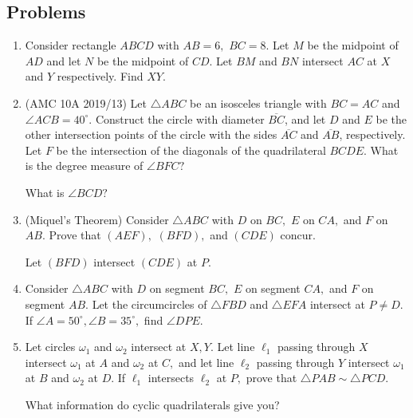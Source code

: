 \subsection{Problems}

\begin{enumerate}
    \item Consider rectangle $ABCD$ with $AB = 6,$ $BC = 8.$ Let $M$ be the midpoint of $AD$ and let $N$ be the midpoint of $CD.$ Let $BM$ and $BN$ intersect $AC$ at $X$ and $Y$ respectively. Find $XY.$

    \item (AMC 10A 2019/13) Let $\triangle ABC$ be an isosceles triangle with $BC = AC$ and $\angle ACB = 40^{\circ}$. Construct the circle with diameter $\overline{BC}$, and let $D$ and $E$ be the other intersection points of the circle with the sides $\overline{AC}$ and $\overline{AB}$, respectively. Let $F$ be the intersection of the diagonals of the quadrilateral $BCDE$. What is the degree measure of $\angle BFC?$ \begin{hint}
    \begin{addhint}
    {What is $\angle BCD?$}
    \end{addhint}
    \end{hint}
    
    \item (Miquel's Theorem) Consider $\triangle ABC$ with $D$ on $BC,$ $E$ on $CA,$ and $F$ on $AB.$ Prove that $(AEF),$ $(BFD),$ and $(CDE)$ concur. \begin{hint}
    \begin{addhint}
    {Let $(BFD)$ intersect $(CDE)$ at $P.$}
    \end{addhint}
    \end{hint}
    
    \item Consider $\triangle ABC$ with $D$ on segment $BC,$ $E$ on segment $CA,$ and $F$ on segment $AB.$ Let the circumcircles of $\triangle FBD$ and $\triangle EFA$ intersect at $P\neq D.$ If $\angle A=50^{\circ},\angle B=35^{\circ},$ find $\angle DPE.$
    
    \item Let circles $\omega_1$ and $\omega_2$ intersect at $X,Y.$ Let line $\ell_1$ passing through $X$ intersect $\omega_1$ at $A$ and $\omega_2$ at $C,$ and let line $\ell_2$ passing through $Y$ intersect $\omega_1$ at $B$ and $\omega_2$ at $D.$ If $\ell_1$ intersects $\ell_2$ at $P,$ prove that $\triangle PAB\sim \triangle PCD.$ \begin{hint}
    \begin{addhint}
    {What information do cyclic quadrilaterals give you?}
    \end{addhint}
    \end{hint}
    

\end{enumerate}
